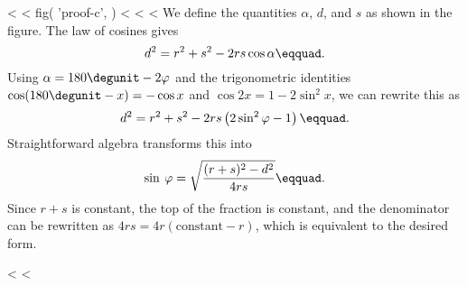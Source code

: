 <%
<%
  fig(
    'proof-c',
  )
<%
<%
<%
We define the quantities $\alpha$, $d$, and $s$ as shown in
the figure. The law of cosines gives
\begin{equation*}
 d^2 = r^2+s^2-2rs\cos\alpha\eqquad.
\end{equation*}
Using $\alpha =180\degunit-2\varphi$ and the trigonometric
identities $\cos (180\degunit-x)=-\cos x$ and
$\cos 2x= 1-2 \sin^2 x$, we can rewrite this as
\begin{equation*}
       d^2 = r^2 + s^2 - 2rs\left(2\sin^2\varphi-1\right)\eqquad.
\end{equation*}
Straightforward algebra transforms this into
\begin{equation*}
  \sin\:\varphi = \sqrt{\frac{(r+s)^2-d^2}{4rs}}\eqquad.
\end{equation*}
Since $r+s$ is constant, the top of the fraction is
constant, and the denominator can be rewritten as $4rs=4r(\text{constant}-r)$,
which is equivalent to the desired form.

<%
<%
